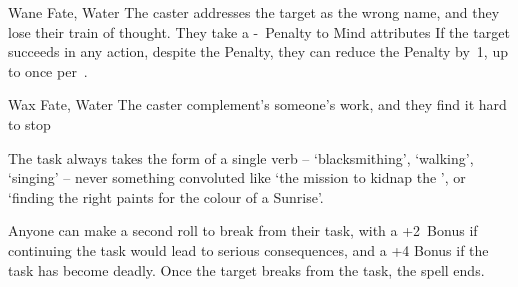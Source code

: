 \ifodd\value{diceNo}

  {}%
  {Wane}%
  {Fate, Water}%
  {}%
  {The caster addresses the target as the wrong name, and they lose their train of thought.
    They take a -~Penalty to Mind \glspl{attribute}}%
  {If the target succeeds in any action, despite the Penalty, they can reduce the Penalty by~1, up to once per~.}

\else

  {}%
  {Wax}%
  {Fate, Water}%
  {}%
  {The caster complement's someone's work, and they find it hard to stop}%
  {The task always takes the form of a single verb -- `blacksmithing', `walking', `singing' -- never something convoluted like `the mission to kidnap the ', or `finding the right paints for the colour of a Sunrise'.

    Anyone can make a second roll to break from their task, with a +2~Bonus if continuing the task  would lead to serious consequences, and a +4 Bonus if the task has become deadly.
	Once the target breaks from the task, the spell ends.}

\fi
{}
